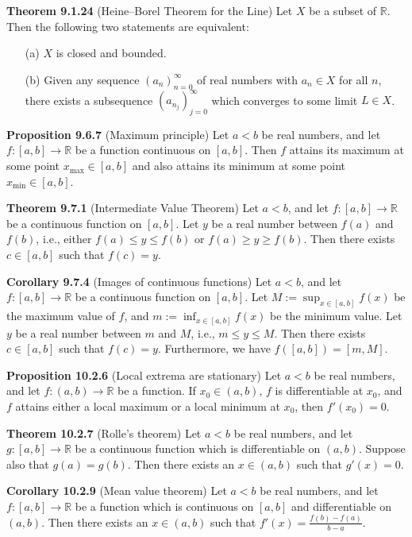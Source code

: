 \documentclass{article}
\begin{document}
\medskip

\textbf{Theorem 9.1.24} (Heine–Borel Theorem for the Line) Let $X$ be a subset of
$\mathbb{R}$. Then the following two statements are equivalent:

\begin{itemize}
    \item[(a)] $X$ is closed and bounded.
    \item[(b)] Given any sequence $(a_n)_{n=0}^{\infty}$ of real numbers with
          $a_n \in X$ for all $n$, there exists a subsequence $(a_{n_j})_{j=0}^{\infty}$
          which converges to some limit $L \in X$.
\end{itemize}

\medskip

\textbf{Proposition 9.6.7} (Maximum principle) Let $a < b$ be real numbers, and
let $f : [a, b] \to \mathbb{R}$ be a function continuous on $[a, b]$. Then $f$
attains its maximum at some point $x_{\text{max}} \in [a, b]$ and also attains
its minimum at some point $x_{\text{min}} \in [a, b]$.

\medskip

\textbf{Theorem 9.7.1} (Intermediate Value Theorem) Let $a < b$, and let
$f : [a, b] \to \mathbb{R}$ be a continuous function on $[a, b]$. Let $y$ be a
real number between $f(a)$ and $f(b)$, i.e., either
$f(a) \leq y \leq f(b)$ or $f(a) \geq y \geq f(b)$. Then there exists
$c \in [a, b]$ such that $f(c) = y$.

\medskip

\textbf{Corollary 9.7.4} (Images of continuous functions) Let $a < b$, and let
$f : [a, b] \to \mathbb{R}$ be a continuous function on $[a, b]$. Let
$M := \sup_{x \in [a, b]} f(x)$ be the maximum value of $f$, and
$m := \inf_{x \in [a, b]} f(x)$ be the minimum value.
Let $y$ be a real number between $m$ and $M$, i.e.,
$m \leq y \leq M$. Then there exists $c \in [a, b]$ such that
$f(c) = y$.
Furthermore, we have
\(
f([a, b]) = [m, M].
\)

\medskip

\textbf{Proposition 10.2.6} (Local extrema are stationary) Let $a < b$ be real
numbers, and let $f : (a, b) \to \mathbb{R}$ be a function. If $x_0 \in (a, b)$,
$f$ is differentiable at $x_0$, and $f$ attains either a local maximum or a local
minimum at $x_0$, then $f'(x_0) = 0$.

\medskip

\textbf{Theorem 10.2.7} (Rolle's theorem) Let $a < b$ be real numbers, and let
$g : [a, b] \to \mathbb{R}$ be a continuous function which is differentiable on
$(a, b)$. Suppose also that $g(a) = g(b)$. Then there exists an $x \in (a, b)$
such that $g'(x) = 0$.

\medskip

\textbf{Corollary 10.2.9} (Mean value theorem) Let $a < b$ be real numbers, and
let $f : [a, b] \to \mathbb{R}$ be a function which is continuous on $[a, b]$ and
differentiable on $(a, b)$. Then there exists an $x \in (a, b)$ such that
\(
f'(x) = \frac{f(b) - f(a)}{b - a}.
\)
\end{document}
